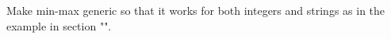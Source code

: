 \begin{Exercise}[title={Interfaces and min-max},difficulty=1]
\Question
Make min-max generic so that it works for both integers and strings
as in the example in section "".
\end{Exercise}

\begin{Answer}
\Question
\end{Answer}
